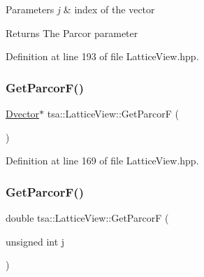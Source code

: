 \begin{DoxyParams}{Parameters}
{\em j} & index of the vector \\
\hline
\end{DoxyParams}
\begin{DoxyReturn}{Returns}
The Parcor parameter 
\end{DoxyReturn}


Definition at line 193 of file Lattice\+View.\+hpp.

\mbox{\label{classtsa_1_1_lattice_view_a302999b98f7af945965749026dc655f9}} 
\subsubsection{\texorpdfstring{Get\+Parcor\+F()}{GetParcorF()}\hspace{0.1cm}{\footnotesize\ttfamily [1/2]}}
{\footnotesize\ttfamily \hyperlink{namespacetsa_a8900fb03d849baf447a1a0efe2561fb2}{Dvector}$\ast$ tsa\+::\+Lattice\+View\+::\+Get\+ParcorF (\begin{DoxyParamCaption}{ }\end{DoxyParamCaption})\hspace{0.3cm}{\ttfamily [inline]}}



Definition at line 169 of file Lattice\+View.\+hpp.

\mbox{\label{classtsa_1_1_lattice_view_a941542e69cf15f8a41cfc17253cd5d48}} 
\subsubsection{\texorpdfstring{Get\+Parcor\+F()}{GetParcorF()}\hspace{0.1cm}{\footnotesize\ttfamily [2/2]}}
{\footnotesize\ttfamily double tsa\+::\+Lattice\+View\+::\+Get\+ParcorF (\begin{DoxyParamCaption}\item[{unsigned int}]{j }\end{DoxyParamCaption})\hspace{0.3cm}{\ttfamily [inline]}}


